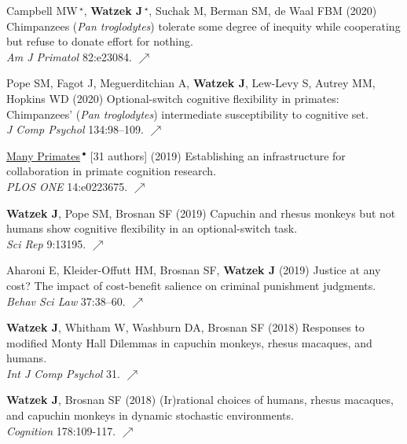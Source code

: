 \documentclass[]{friggeri-cv}
\begin{document}
\begin{enumerate}[label={[\,\arabic*\,]}]
  \item {Campbell MW\,{\Large${}^\star$}, \textbf{Watzek J\,{\Large${}^\star$}}, Suchak M, Berman SM, de Waal FBM (2020) Chimpanzees (\emph{Pan troglodytes}) tolerate some degree of inequity while cooperating but refuse to donate effort for nothing. \\\emph{Am J Primatol} 82:e23084. \href{https://doi.org/10.1002/ajp.23084}{\small $\nearrow$} }
  \item {Pope SM, Fagot J, Meguerditchian A, \textbf{Watzek J}, Lew-Levy S, Autrey MM, Hopkins WD (2020) Optional-switch cognitive flexibility in primates: Chimpanzees' (\emph{Pan troglodytes}) intermediate susceptibility to cognitive set. \\\emph{J Comp Psychol} 134:98–109. \href{https://doi.org/10.1037/com0000194}{\small $\nearrow$} }
  \item {\ul{Many Primates}\,${}^\bullet$ [31 authors] (2019) Establishing an infrastructure for collaboration in primate cognition research. \\\emph{PLOS ONE} 14:e0223675. \href{https://doi.org/10.1371/journal.pone.0223675}{\small $\nearrow$}}
  \item {\textbf{Watzek J}, Pope SM, Brosnan SF (2019) Capuchin and rhesus monkeys but not humans show cognitive flexibility in an optional-switch task. \\\emph{Sci Rep} 9:13195. \href{https://doi.org/10.1038/s41598-019-49658-0}{\small $\nearrow$}}
  \item {Aharoni E, Kleider-Offutt HM, Brosnan SF, \textbf{Watzek J} (2019) Justice at any cost? The impact of cost-benefit salience on criminal punishment judgments. \\\emph{Behav Sci Law} 37:38–60. \href{https://doi.org/10.1002/bsl.2388}{{\small $\nearrow$}}}
  \item {\textbf{Watzek J}, Whitham W, Washburn DA, Brosnan SF (2018) Responses to modified Monty Hall Dilemmas in capuchin monkeys, rhesus macaques, and humans. \\\emph{Int J Comp Psychol} 31. \href{https://escholarship.org/uc/item/1jn0t21r}{\small $\nearrow$}}
  \item {\textbf{Watzek J}, Brosnan SF (2018) (Ir)rational choices of humans, rhesus macaques, and capuchin monkeys in dynamic stochastic environments. \\\emph{Cognition} 178:109-117. \href{https://doi.org/10.1016/j.cognition.2018.05.019}{\small $\nearrow$}} \enlargethispage{1.75\baselineskip}

\end{enumerate}
\end{document}
